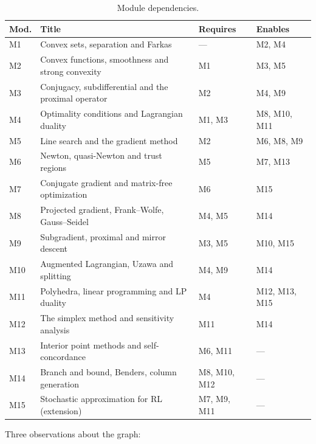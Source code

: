 \documentclass[11pt,a4paper]{article}
\begin{document}
\begin{table}[htbp]
\centering
\small
\caption{Module dependencies.}
\label{tab:dep}
\begin{tabular}{@{}l L{6.4cm} L{2.6cm} L{3.2cm}@{}}
\toprule
\textbf{Mod.} & \textbf{Title} & \textbf{Requires} & \textbf{Enables} \\
\midrule
M1  & Convex sets, separation and Farkas                     & ---            & M2, M4 \\
M2  & Convex functions, smoothness and strong convexity      & M1             & M3, M5 \\
M3  & Conjugacy, subdifferential and the proximal operator   & M2             & M4, M9 \\
M4  & Optimality conditions and Lagrangian duality           & M1, M3         & M8, M10, M11 \\
M5  & Line search and the gradient method                    & M2             & M6, M8, M9 \\
M6  & Newton, quasi-Newton and trust regions                 & M5             & M7, M13 \\
M7  & Conjugate gradient and matrix-free optimization        & M6             & M15 \\
M8  & Projected gradient, Frank--Wolfe, Gauss--Seidel        & M4, M5         & M14 \\
M9  & Subgradient, proximal and mirror descent               & M3, M5         & M10, M15 \\
M10 & Augmented Lagrangian, Uzawa and splitting              & M4, M9         & M14 \\
M11 & Polyhedra, linear programming and LP duality           & M4             & M12, M13, M15 \\
M12 & The simplex method and sensitivity analysis            & M11            & M14 \\
M13 & Interior point methods and self-concordance            & M6, M11        & --- \\
M14 & Branch and bound, Benders, column generation           & M8, M10, M12   & --- \\
M15 & Stochastic approximation for RL (extension)            & M7, M9, M11    & --- \\
\bottomrule
\end{tabular}
\end{table}

Three observations about the graph:
\end{document}
